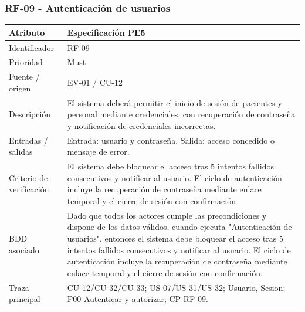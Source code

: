 \documentclass[11pt,a4paper]{article}
\begin{document}
	\subsubsection{RF-09 - Autenticación de usuarios}
	\begin{tabularx}{\textwidth}{p{3.2cm}Y}
		\toprule
		\textbf{Atributo} & \textbf{Especificación PE5}\\\midrule
		Identificador & RF-09\\
		Prioridad & Must\\
		Fuente / origen & EV-01 / CU-12\\
		Descripción & El sistema deberá permitir el inicio de sesión de pacientes y personal mediante credenciales, con recuperación de contraseña y notificación de credenciales incorrectas.\\
		Entradas / salidas & Entrada: usuario y contraseña. Salida: acceso concedido o mensaje de error.\\
		Criterio de verificación & El sistema debe bloquear el acceso tras 5 intentos fallidos consecutivos y notificar al usuario. El ciclo de autenticación incluye la recuperación de contraseña mediante enlace temporal y el cierre de sesión con confirmación\\
		BDD asociado & Dado que todos los actores cumple las precondiciones y dispone de los datos válidos, cuando ejecuta "Autenticación de usuarios", entonces el sistema debe bloquear el acceso tras 5 intentos fallidos consecutivos y notificar al usuario. El ciclo de autenticación incluye la recuperación de contraseña mediante enlace temporal y el cierre de sesión con confirmación.\\
		Traza principal & CU-12/CU-32/CU-33; US-07/US-31/US-32; Usuario, Sesion; P00 Autenticar y autorizar; CP-RF-09.\\
		\bottomrule
	\end{tabularx}
\end{document}
